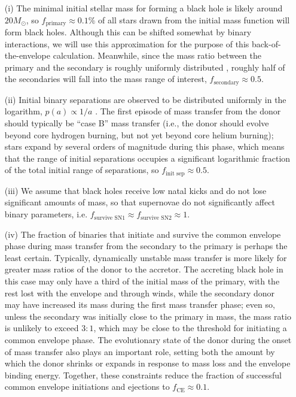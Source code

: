 \documentclass[iop,onecolumn]{revtex4-1}
\begin{document}
\begin{enumerate}
	\item[(i)] The minimal initial stellar mass for forming a black hole is likely around $20 M_\odot$, so $f_\textrm{primary} \approx 0.1\%$ of all stars drawn from the \citet{Kroupa:2002} initial mass function will form black holes. Although this can be shifted somewhat by binary interactions, we will use this approximation for the purpose of this back-of-the-envelope calculation. Meanwhile, since the mass ratio between the primary and the secondary is roughly uniformly distributed \citep{Sana:2012,MoeDiStefano:2017}, roughly half of the secondaries will fall into the mass range of interest, $f_\textrm{secondary} \approx 0.5$.  

\item[(ii)] Initial binary  separations are observed to be distributed uniformly in the logarithm, $p(a) \propto 1/a$ \citep{Opik:1924}.  The first episode of mass transfer from the donor should typically be ``case B'' mass transfer (i.e., the donor should evolve beyond core hydrogen burning, but not yet beyond core helium burning); stars expand by several orders of magnitude during this phase, which means that the range of initial separations occupies a significant logarithmic fraction of the total initial range of separations, so $f_\textrm{init sep} \approx 0.5$.  

\item[(iii)]  We assume that black holes receive low natal kicks and do not lose significant amounts of mass, so that supernovae do not significantly affect binary parameters, i.e. $f_\textrm{survive SN1} \approx f_\textrm{survive SN2} \approx 1$.  

\item[(iv)] The fraction of binaries that initiate and survive the common envelope phase during mass transfer from the secondary to the primary is perhaps the least certain.  Typically, dynamically unstable mass transfer is more likely for greater mass ratios of the donor to the accretor.  The accreting black hole in this case may only have a third of the initial mass of the primary, with the rest lost with the envelope and through winds, while the secondary donor may have increased its mass during the first mass transfer phase; even so, unless the secondary was initially close to the primary in mass, the mass ratio is unlikely to exceed $3:1$, which may be close to the threshold for initiating a common envelope phase.  The evolutionary state of the donor during the onset of mass transfer also plays an important role, setting both the amount by which the donor shrinks or expands in response to mass loss and the envelope binding energy.  Together, these constraints reduce the fraction of successful common envelope initiations and ejections to $f_\textrm{CE} \approx 0.1$.  


\end{enumerate}
\end{document}
